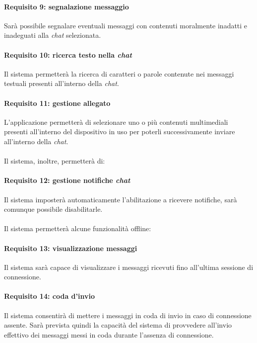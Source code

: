 \paragraph{Requisito 9: segnalazione messaggio\\}
Sarà possibile segnalare eventuali messaggi con contenuti moralmente inadatti e inadeguati alla \emph{chat} selezionata.

\paragraph{Requisito 10: ricerca testo nella \emph{chat}\\}
Il sistema permetterà la ricerca di caratteri o parole contenute nei messaggi testuali presenti all’interno della \emph{chat}.

\paragraph{Requisito 11: gestione allegato\\}
L’applicazione permetterà di selezionare uno o più contenuti multimediali presenti all’interno del dispositivo in uso per poterli successivamente inviare all’interno della \emph{chat}.\\
\\
Il sistema, inoltre, permetterà di:

\paragraph{Requisito 12: gestione notifiche \emph{chat}\\}
Il sistema imposterà automaticamente l’abilitazione a ricevere notifiche, sarà comunque possibile disabilitarle.\\
\\

Il sistema permetterà alcune funzionalità offline:

\paragraph{Requisito 13: visualizzazione messaggi\\}
Il sistema sarà capace di visualizzare i messaggi ricevuti fino all’ultima sessione di connessione.

\paragraph{Requisito 14: coda d'invio\\}
Il sistema consentirà di mettere i messaggi in coda di invio in caso di connessione assente. Sarà prevista quindi la capacità del sistema di provvedere all’invio effettivo dei messaggi messi in coda durante l’assenza di connessione.


